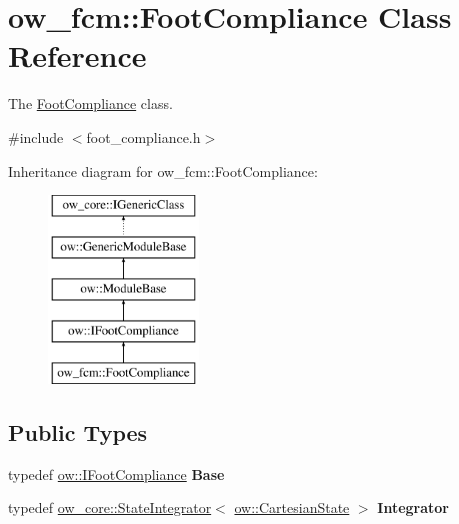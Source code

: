 \hypertarget{classow__fcm_1_1FootCompliance}{}\section{ow\+\_\+fcm\+:\+:Foot\+Compliance Class Reference}
\label{classow__fcm_1_1FootCompliance}


The \hyperlink{classow__fcm_1_1FootCompliance}{Foot\+Compliance} class.  




{\ttfamily \#include $<$foot\+\_\+compliance.\+h$>$}

Inheritance diagram for ow\+\_\+fcm\+:\+:Foot\+Compliance\+:\begin{figure}[H]
\begin{center}
\leavevmode
\includegraphics[height=5.000000cm]{d6/d5a/classow__fcm_1_1FootCompliance}
\end{center}
\end{figure}
\subsection*{Public Types}
\begin{DoxyCompactItemize}
\item 
typedef \hyperlink{classow_1_1IFootCompliance}{ow\+::\+I\+Foot\+Compliance} {\bfseries Base}\hypertarget{classow__fcm_1_1FootCompliance_aa7b8154640cdf754303e986461fc9158}{}\label{classow__fcm_1_1FootCompliance_aa7b8154640cdf754303e986461fc9158}

\item 
typedef \hyperlink{classow__core_1_1StateIntegrator}{ow\+\_\+core\+::\+State\+Integrator}$<$ \hyperlink{classow__core_1_1CartesianState}{ow\+::\+Cartesian\+State} $>$ {\bfseries Integrator}\hypertarget{classow__fcm_1_1FootCompliance_a27243ae2a8864237ab2a3ef891c8da40}{}\label{classow__fcm_1_1FootCompliance_a27243ae2a8864237ab2a3ef891c8da40}

\end{DoxyCompactItemize}
